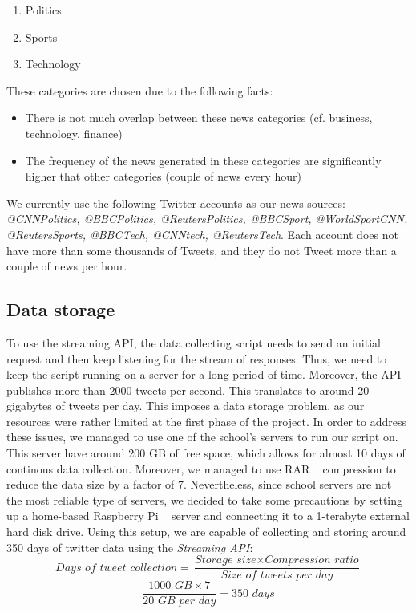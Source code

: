 \documentclass{llncs}
\begin{document}
\begin{enumerate}
  \item Politics
  \item Sports
  \item Technology
\end{enumerate}

These categories are chosen due to the following facts:
\begin{itemize}
  \item There is not much overlap between these news categories (cf. business, technology, finance)
  \item The frequency of the news generated in these categories are significantly higher that other categories (couple of news every hour)
\end{itemize}

We currently use the following Twitter accounts as our news sources: \textit{@CNNPolitics, @BBCPolitics, @ReutersPolitics, @BBCSport, @WorldSportCNN, @ReutersSports, @BBCTech, @CNNtech, @ReutersTech}. Each account does not have more than some thousands of Tweets, and they do not Tweet more than a couple of news per hour.

\subsection{Data storage}
To use the streaming API, the data collecting script needs to send an initial request and then keep listening for the stream of responses. Thus, we need to keep the script running on a server for a long period of time. Moreover, the API publishes more than 2000 tweets per second. This translates to around 20 gigabytes of tweets per day. This imposes a data storage problem, as our resources were rather limited at the first phase of the project. In order to address these issues, we managed to use one of the school's servers to run our script on. This server have around 200 GB of free space, which allows for almost 10 days of continous data collection. Moreover, we managed to use RAR ~\cite{wiki:RAR} compression to reduce the data size by a factor of 7. Nevertheless, since school servers are not the most reliable type of servers, we decided to take some precautions by setting up a home-based Raspberry Pi ~\cite{wiki:raspberrypi} server and connecting it to a 1-terabyte external hard disk drive. Using this setup, we are capable of collecting and storing around 350 days of twitter data using the \textit{Streaming API}:
\[\textit{Days of tweet collection}=\frac{\textit{Storage size}\times \textit{Compression ratio}} {\textit{Size of tweets per day}}\]
\[\frac{\textit{1000 GB} \times 7}{\textit{20 GB per day}}=\textit{350 days} \]
\end{document}
